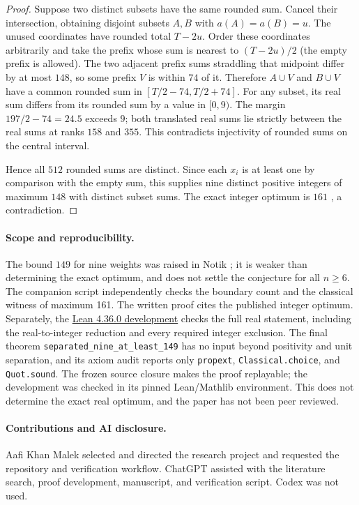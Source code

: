 \documentclass[11pt,letterpaper]{article}
\begin{document}
\begin{proof}
Suppose two distinct subsets have the same rounded sum. Cancel
their intersection, obtaining disjoint subsets $A,B$ with
$a(A)=a(B)=u$. The unused coordinates have rounded total
$T-2u$. Order these coordinates arbitrarily and take the
prefix whose sum is nearest to $(T-2u)/2$ (the empty prefix
is allowed). The two adjacent prefix sums straddling that
midpoint differ by at most $148$, so some prefix $V$ is
within $74$ of it. Therefore $A\cup V$ and $B\cup V$ have
a common rounded sum in $[T/2-74,T/2+74]$.
For any subset, its real sum differs from its rounded sum by
a value in $[0,9)$. The margin $197/2-74=24.5$ exceeds $9$;
both translated real sums lie strictly between the real sums at
ranks $158$ and $355$. This contradicts injectivity of rounded
sums on the central interval.

Hence all $512$ rounded sums are distinct. Since each $x_i$ is at
least one by comparison with the empty sum, this supplies nine
distinct positive integers of maximum $148$ with distinct subset
sums. The exact integer optimum is $161$ \cite[Table 5]{bm},
a contradiction.
\end{proof}

\paragraph{Scope and reproducibility.}
The bound $149$ for nine weights was raised in
Notik \cite[Section 7, item 4]{notik}; it is weaker than
determining the exact optimum, and does not settle the conjecture
for all $n\ge6$. The companion script independently checks the boundary count and
the classical witness of maximum 161. The written proof cites the
published integer optimum. Separately, the
\href{https://github.com/Aafimalek/novel-discoveries/tree/research/lean-rounding/nine-separated-subset-sums/verification/lean-real-149}{Lean 4.36.0 development}
checks the full real statement, including the real-to-integer
reduction and every required integer exclusion. The final theorem
\texttt{separated\_nine\_at\_least\_149} has no input beyond positivity
and unit separation, and its axiom audit reports only
\texttt{propext}, \texttt{Classical.choice}, and \texttt{Quot.sound}.
The frozen source closure makes the proof replayable; the development
was checked in its pinned Lean/Mathlib environment. This does not
determine the exact real optimum, and the paper has not been peer
reviewed.

\paragraph{Contributions and AI disclosure.}
Aafi Khan Malek selected and directed the research project and requested
the repository and verification workflow. ChatGPT assisted with the
literature search, proof development, manuscript, and verification
script. Codex was not used.
\end{document}
